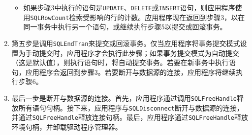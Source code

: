 \documentclass[lang=cn,11pt,a4paper,cite=authornum]{paper}
\begin{document}
\begin{enumerate}
\begin{itemize}
    \item 如果步骤3中执行的语句是\texttt{UPDATE}、\texttt{DELETE}或\texttt{INSERT}语句，则应用程序使用\texttt{SQLRowCount}检索受影响的行的计数。应用程序现在返回到步骤3，以在同一事务中执行另一个语句，或继续执行步骤5以提交或回滚事务。
    \end{itemize}
    \item 第五步是调用\texttt{SQLEndTran}来提交或回滚事务。仅当应用程序将事务提交模式设置为手动提交时，应用程序才会执行此步骤；如果事务提交模式为自动提交（这是默认值），则执行语句时，将自动提交事务。若要在新事务中执行语句，应用程序会返回到步骤3。若要断开与数据源的连接，应用程序将继续执行步骤6。
    \item 最后一步是断开与数据源的连接。首先，应用程序通过调用\texttt{SQLFreeHandle}释放所有语句句柄。接下来，应用程序与\texttt{SQLDisconnect}断开与数据源的连接，并通过\texttt{SQLFreeHandle}释放连接句柄。最后，应用程序通过\texttt{SQLFreeHandle}释放环境句柄，并卸载驱动程序管理器。
\end{enumerate}
\end{document}
